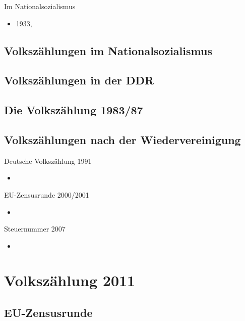 \documentclass[ignorenonframetext,ucs]{beamer}
\begin{document}
\begin{frame}{Im Nationalsozialismus}\begin{itemize}
\item 1933, 
\end{itemize}\end{frame}

\subsection{Volkszählungen im Nationalsozialismus}

\subsection{Volkszählungen in der DDR}

\subsection{Die Volkszählung 1983/87}

\subsection{Volkszählungen nach der Wiedervereinigung}

\begin{frame}{Deutsche Volkszählung 1991}\begin{itemize}
\item
\end{itemize}\end{frame}

\begin{frame}{EU-Zensusrunde 2000/2001}\begin{itemize}
\item
\end{itemize}\end{frame}

\begin{frame}{Steuernummer 2007}\begin{itemize}
\item
\end{itemize}\end{frame}

\section{Volkszählung 2011}

\subsection{EU-Zensusrunde}
\end{document}
